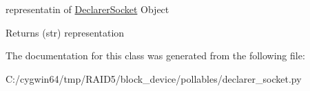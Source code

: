 representatin of \hyperlink{class_r_a_i_d5_1_1block__device_1_1pollables_1_1declarer__socket_1_1_declarer_socket}{Declarer\+Socket} Object 

\begin{DoxyReturn}{Returns}
(str) representation 
\end{DoxyReturn}


The documentation for this class was generated from the following file\+:\begin{DoxyCompactItemize}
\item 
C\+:/cygwin64/tmp/\+R\+A\+I\+D5/block\+\_\+device/pollables/declarer\+\_\+socket.\+py\end{DoxyCompactItemize}
